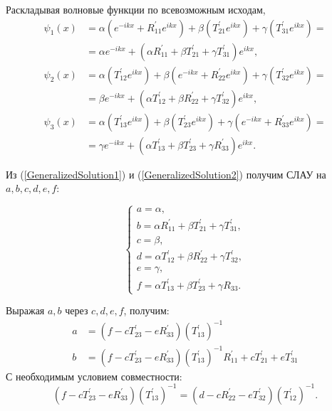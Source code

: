 \documentclass[a4 paper, 12 pt]{extarticle}
\begin{document}
   Раскладывая волновые функции по всевозможным исходам,
   \begin{equation}
   \label{GeneralizedSolution2}
   \begin{aligned}
   \psi_1(x) &= \alpha\left(e^{-ikx} + R_{11}^\prime e^{ikx}\right) + \beta\left(T_{21}^\prime e^{ikx}\right) + \gamma \left(T_{31}^\prime e^{ikx}\right) = \\
   &= \alpha e^{-ikx} + \left(\alpha R_{11}^\prime  + \beta T_{21}^\prime  + \gamma T_{31}^\prime \right) e^{ikx}, \\
   \psi_2(x) &= \alpha \left(T_{12}^\prime  e^{ikx}\right) + \beta \left(e^{-ikx} + R_{22}^\prime  e^{ikx}\right) + \gamma \left(T_{32}^\prime  e^{ikx}\right) = \\
   &= \beta e^{-ikx} + \left(\alpha T_{12}^\prime  + \beta R_{22}^\prime  + \gamma T_{32}^\prime \right) e^{ikx}, \\
   \psi_3(x) &= \alpha \left(T_{13}^\prime  e^{ikx}\right) + \beta \left(T_{23}^\prime  e^{ikx}\right) + \gamma \left(e^{-ikx} + R_{33}^\prime  e^{ikx}\right) = \\
   &= \gamma e^{-ikx} + \left(\alpha T_{13}^\prime  + \beta T_{23}^\prime  + \gamma R_{33}^\prime \right) e^{ikx}.
   \end{aligned}
   \end{equation}
   
   Из (\ref{GeneralizedSolution1}) и (\ref{GeneralizedSolution2}) получим СЛАУ на $a, b, c, d, e, f$:
   
   \[
   \begin{cases}
   a = \alpha, \\
   b = \alpha R_{11}^\prime  + \beta T_{21}^\prime  + \gamma T_{31}^\prime , \\
   c = \beta, \\
   d = \alpha T_{12}^\prime  + \beta R_{22}^\prime  + \gamma T_{32}^\prime , \\
   e = \gamma, \\
   f = \alpha T_{13}^\prime  + \beta T_{23}^\prime  + \gamma R_{33}.
   \end{cases}
   \]
   
   Выражая $a, b$ через $c, d, e, f$, получим:
   \[
   \begin{aligned}
   a &= \left(f - cT_{23}^\prime  - eR_{33}^\prime \right)\left(T_{13}^\prime\right)^{-1} \\
   b &= \left(f - cT_{23}^\prime  - eR_{33}^\prime \right)\left(T_{13}^\prime\right)^{-1}R_{11}^\prime + cT_{21}^\prime + eT_{31}^\prime
   \end{aligned}
   \]
   С необходимым условием совместности:
   \begin{equation}
   \label{compabilityConditionGeneralized}
   \left(f - cT_{23}^\prime - eR_{33}^\prime\right)\left(T_{13}^\prime\right)^{-1} = \left(d - cR_{22}^\prime - eT_{32}^\prime\right)\left(T_{12}^\prime\right)^{-1}.
   \end{equation}
   
\end{document}
